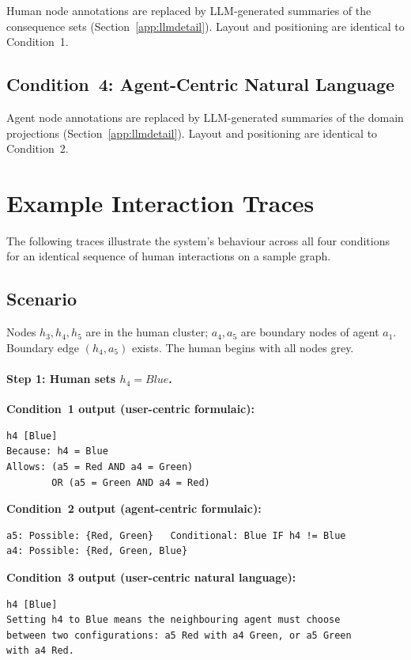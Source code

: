 \documentclass[10pt]{article}
\theoremstyle{definition}
\begin{document}
Human node annotations are replaced by LLM-generated summaries of the consequence sets
(Section~\ref{app:llmdetail}).  Layout and positioning are identical to Condition~1.

\subsection{Condition~4: Agent-Centric Natural Language}

Agent node annotations are replaced by LLM-generated summaries of the domain projections
(Section~\ref{app:llmdetail}).  Layout and positioning are identical to Condition~2.

\section{Example Interaction Traces}
\label{app:traces}

The following traces illustrate the system's behaviour across all four conditions for an identical
sequence of human interactions on a sample graph.

\subsection{Scenario}

Nodes $h_3, h_4, h_5$ are in the human cluster; $a_4, a_5$ are boundary nodes of agent $a_1$.
Boundary edge $(h_4, a_5)$ exists.  The human begins with all nodes grey.

\paragraph{Step 1: Human sets $h_4 = \textit{Blue}$.}

\noindent \textbf{Condition~1 output (user-centric formulaic):}
\begin{lstlisting}
h4 [Blue]
Because: h4 = Blue
Allows: (a5 = Red AND a4 = Green)
        OR (a5 = Green AND a4 = Red)
\end{lstlisting}

\noindent \textbf{Condition~2 output (agent-centric formulaic):}
\begin{lstlisting}
a5: Possible: {Red, Green}   Conditional: Blue IF h4 != Blue
a4: Possible: {Red, Green, Blue}
\end{lstlisting}

\noindent \textbf{Condition~3 output (user-centric natural language):}
\begin{lstlisting}
h4 [Blue]
Setting h4 to Blue means the neighbouring agent must choose
between two configurations: a5 Red with a4 Green, or a5 Green
with a4 Red.
\end{lstlisting}
\end{document}
